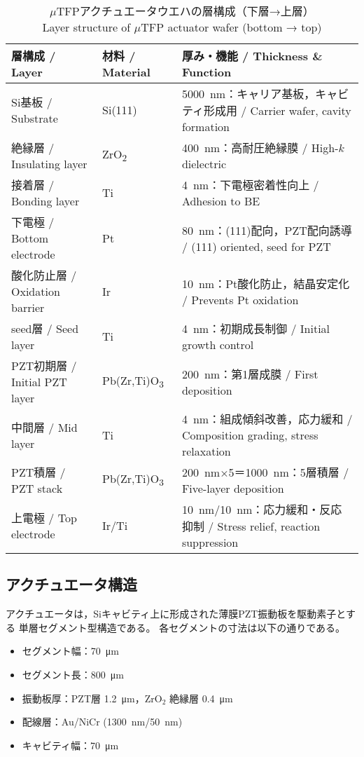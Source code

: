 \documentclass[conference]{IEEEtran}
\begin{document}
\begin{table*}[t]
  \centering
  \caption{%
    $\mu$TFPアクチュエータウエハの層構成（下層→上層）\\
    Layer structure of $\mu$TFP actuator wafer (bottom → top)
  }
  \label{tab:layer-structure}
  \begin{tabular}{lll}
    \hline
    \textbf{層構成 / Layer} & \textbf{材料 / Material} & \textbf{厚み・機能 / Thickness \& Function} \\
    \hline
    Si基板 / Substrate & Si(111) & \SI{5000}{nm}：キャリア基板，キャビティ形成用 / Carrier wafer, cavity formation \\
    絶縁層 / Insulating layer & ZrO\textsubscript{2} & \SI{400}{nm}：高耐圧絶縁膜 / High-$k$ dielectric \\
    接着層 / Bonding layer & Ti & \SI{4}{nm}：下電極密着性向上 / Adhesion to BE \\
    下電極 / Bottom electrode & Pt & \SI{80}{nm}：(111)配向，PZT配向誘導 / (111) oriented, seed for PZT \\
    酸化防止層 / Oxidation barrier & Ir & \SI{10}{nm}：Pt酸化防止，結晶安定化 / Prevents Pt oxidation \\
    seed層 / Seed layer & Ti & \SI{4}{nm}：初期成長制御 / Initial growth control \\
    PZT初期層 / Initial PZT layer & Pb(Zr,Ti)O\textsubscript{3} & \SI{200}{nm}：第1層成膜 / First deposition \\
    中間層 / Mid layer & Ti & \SI{4}{nm}：組成傾斜改善，応力緩和 / Composition grading, stress relaxation \\
    PZT積層 / PZT stack & Pb(Zr,Ti)O\textsubscript{3} & \SI{200}{nm}×5＝\SI{1000}{nm}：5層積層 / Five-layer deposition \\
    上電極 / Top electrode & Ir/Ti & \SI{10}{nm}/\SI{10}{nm}：応力緩和・反応抑制 / Stress relief, reaction suppression \\
    \hline
  \end{tabular}
\end{table*}

\subsection{アクチュエータ構造}
アクチュエータは，Siキャビティ上に形成された薄膜PZT振動板を駆動素子とする
単層セグメント型構造である。
各セグメントの寸法は以下の通りである。
\begin{itemize}
  \item セグメント幅：\SI{70}{\micro m}
  \item セグメント長：\SI{800}{\micro m}
  \item 振動板厚：PZT層 \SI{1.2}{\micro m}，ZrO$_2$ 絶縁層 \SI{0.4}{\micro m}
  \item 配線層：Au/NiCr (\SI{1300}{nm}/\SI{50}{nm})
  \item キャビティ幅：\SI{70}{\micro m}
\end{itemize}
\end{document}
